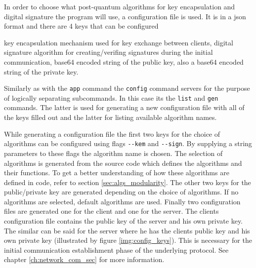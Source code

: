 In order to choose what post-quantum algorithms for key encapsulation and digital signature the program will use, a configuration file is used. It is in a json format and there are 4 keys that can be configured
\begin{itemize}
  key encapsulation mechanism used for key exchange between clients,
  digital signature algorithm for creating/verifing signatures during the initial communication,
  base64 encoded string of the public key,
  also a base64 encoded string of the private key.
\end{itemize}
Similarly as with the \texttt{app} command the \texttt{config} command servers for the purpose of logically separating subcommands. In this case its the \texttt{list} and \texttt{gen} commands. The latter is used for generating a new configuration file with all of the keys filled out and the latter for listing available algorithm names.

While generating a configuration file the first two keys for the choice of algorithms can be configured using flags \texttt{-\--kem} and \texttt{-\--sign}. By supplying a string parameters to these flags the algorithm name is chosen. The selection of algorithms is generated from the source code which defines the algorithms and their functions. To get a better understanding of how these algorithms are defined in code, refer to section \ref{sec:algs_modularity}. The other two keys for the public/private key are generated depending on the choice of algorithms. If no algorithms are selected, default algorithms are used. Finally two configuration files are generated one for the client and one for the server. The clients configuration file contains the public key of the server and his own private key. The similar can be said for the server where he has the clients public key and his own private key (illustrated by figure \ref{img:config_keys}). This is necessary for the initial communication establishment phase of the underlying protocol. See chapter \ref{ch:network_com_sec} for more information.

